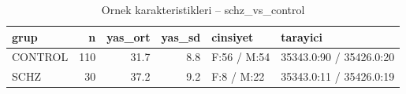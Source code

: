 \begin{table}[htbp]
  \centering
  \caption{Ornek karakteristikleri -- schz\_vs\_control}
  \label{tab:sample_schz_vs_control}
  \small
  \begin{tabular}{lrrrll}
    \toprule
    grup & n & yas\_ort & yas\_sd & cinsiyet & tarayici \\
    \midrule
    CONTROL & 110 & 31.7 & 8.8 & F:56 / M:54 & 35343.0:90 / 35426.0:20 \\
    SCHZ & 30 & 37.2 & 9.2 & F:8 / M:22 & 35343.0:11 / 35426.0:19 \\
    \bottomrule
  \end{tabular}
\end{table}
